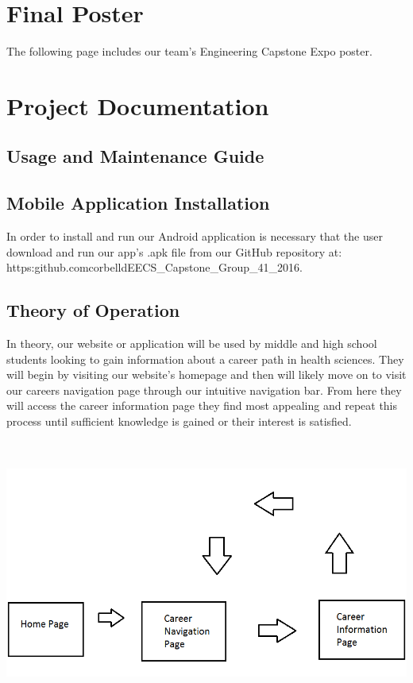 \documentclass[onecolumn, draftclsnofoot,10pt, compsoc]{IEEEtran}
\begin{document}
\section{Final Poster}
\vspace{2cm}\hspace{2.4cm}
\noindent The following page includes our team's Engineering Capstone Expo poster.
\\
\newpage
\section{Project Documentation}
\subsection{Usage and Maintenance Guide}

\subsection{Mobile Application Installation}
\noindent In order to install and run our Android application is necessary that the user download and run our app's .apk file from our GitHub repository at:  https:\/\/github.com\/corbelld\/EECS\_Capstone\_Group\_41\_2016.
\subsection{Theory of Operation}
\noindent In theory, our website or application will be used by middle and high school students looking to gain information about a career path in health sciences. They will begin by visiting our website's homepage and then will likely move on to visit our careers navigation page through our intuitive navigation bar. From here they will access the career information page they find most appealing and repeat this process until sufficient knowledge is gained or their interest is satisfied. 

\includegraphics[width=16cm, height=8.8cm]{doc11.png}
\newpage
\end{document}
